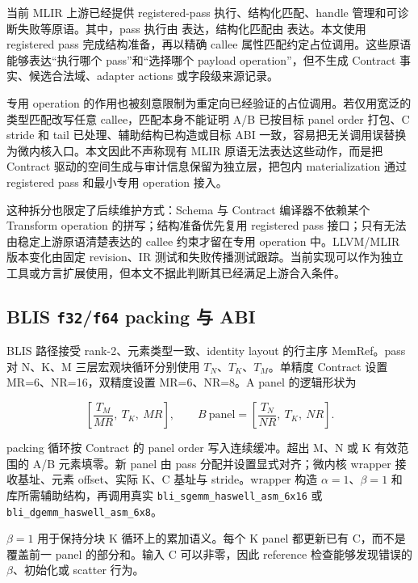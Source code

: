 当前 MLIR 上游已经提供 registered-pass 执行、结构化匹配、handle 管理和可诊断失败等原语\cite{LLVMProjectTransformDialect,Luecke2025TransformDialect}。其中，pass 执行由  表达，结构化匹配由  表达。本文使用 registered pass 完成结构准备，再以精确 callee 属性匹配约定占位调用。这些原语能够表达“执行哪个 pass”和“选择哪个 payload operation”，但不生成 Contract 事实、候选合法域、adapter actions 或字段级来源记录。

专用 operation  的作用也被刻意限制为重定向已经验证的占位调用。若仅用宽泛的  类型匹配改写任意 callee，匹配本身不能证明 A/B 已按目标 panel order 打包、C stride 和 tail 已处理、辅助结构已构造或目标 ABI 一致，容易把无关调用误替换为微内核入口。本文因此不声称现有 MLIR 原语无法表达这些动作，而是把 Contract 驱动的空间生成与审计信息保留为独立层，把包内 materialization 通过 registered pass 和最小专用 operation 接入。

这种拆分也限定了后续维护方式：Schema 与 Contract 编译器不依赖某个 Transform operation 的拼写；结构准备优先复用 registered pass 接口；只有无法由稳定上游原语清楚表达的 callee 约束才留在专用 operation 中。LLVM/MLIR 版本变化由固定 revision、IR 测试和失败传播测试跟踪。当前实现可以作为独立工具或方言扩展使用，但本文不据此判断其已经满足上游合入条件。

\subsection{BLIS \texttt{f32}/\texttt{f64} packing 与 ABI}

BLIS 路径接受 rank-2、元素类型一致、identity layout 的行主序 MemRef。pass 对 N、K、M 三层宏观块循环分别使用 $T_N$、$T_K$、$T_M$。单精度 Contract 设置 MR=6、NR=16，双精度设置 MR=6、NR=8。A panel 的逻辑形状为

\begin{equation}
\left[\frac{T_M}{MR},\ T_K,\ MR\right],
\qquad
B\ \text{panel}=
\left[\frac{T_N}{NR},\ T_K,\ NR\right].
\label{eq:chapter4-packed-panels}
\end{equation}

packing 循环按 Contract 的 panel order 写入连续缓冲。超出 M、N 或 K 有效范围的 A/B 元素填零。新 panel 由 pass 分配并设置显式对齐；微内核 wrapper 接收基址、元素 offset、实际 K、C 基址与 stride。wrapper 构造 $\alpha=1$、$\beta=1$ 和库所需辅助结构，再调用真实 \texttt{bli\_sgemm\_haswell\_asm\_6x16} 或 \texttt{bli\_dgemm\_haswell\_asm\_6x8}。

$\beta=1$ 用于保持分块 K 循环上的累加语义。每个 K panel 都更新已有 C，而不是覆盖前一 panel 的部分和。输入 C 可以非零，因此 reference 检查能够发现错误的 $\beta$、初始化或 scatter 行为。


